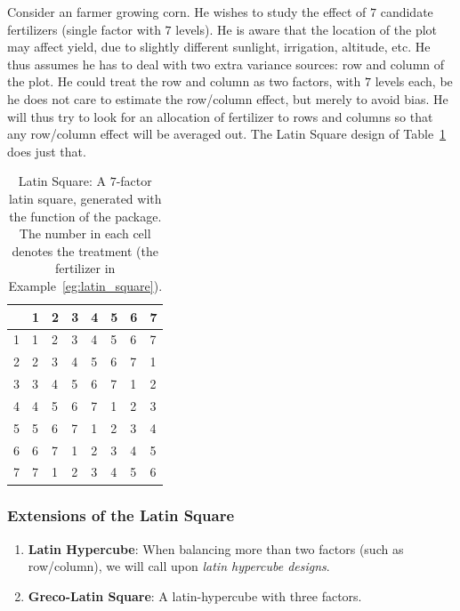 \begin{example}
\label{eg:latin_square}
Consider an farmer growing corn.
He wishes to study the effect of $7$ candidate fertilizers (single factor with $7$ levels).
He is aware that the location of the plot may affect yield, due to slightly different sunlight, irrigation, altitude, etc.
He thus assumes he has to deal with two extra variance sources: row and column of the plot. 
He could treat the row and column as two factors, with $7$ levels each, be he does not care to estimate the row/column effect, but merely to avoid bias.
He will thus try to look for an allocation of fertilizer to rows and columns so that any row/column effect will be averaged out.
The Latin Square design of Table~\ref{tab:latin_square} does just that.
\end{example}
\begin{table}[ht]
\centering
\begin{tabular}{rlllllll}
  \hline
 & 1 & 2 & 3 & 4 & 5 & 6 & 7 \\ 
  \hline
1 & 1 & 2 & 3 & 4 & 5 & 6 & 7 \\ 
  2 & 2 & 3 & 4 & 5 & 6 & 7 & 1 \\ 
  3 & 3 & 4 & 5 & 6 & 7 & 1 & 2 \\ 
  4 & 4 & 5 & 6 & 7 & 1 & 2 & 3 \\ 
  5 & 5 & 6 & 7 & 1 & 2 & 3 & 4 \\ 
  6 & 6 & 7 & 1 & 2 & 3 & 4 & 5 \\ 
  7 & 7 & 1 & 2 & 3 & 4 & 5 & 6 \\ 
   \hline
\end{tabular}
\label{tab:latin_square}
\caption{Latin Square: A $7$-factor latin square, generated with the  function of the  \R package.
The number in each cell denotes the treatment (the fertilizer in Example~\ref{eg:latin_square}).}
\end{table}

\subsubsection{Extensions of the Latin Square}
\begin{enumerate}
\item \textbf{Latin Hypercube}: When balancing more than two factors (such as row/column), we will call upon \emph{latin hypercube designs}.
\item \textbf{Greco-Latin Square}: A latin-hypercube with three factors. 
\end{enumerate}



